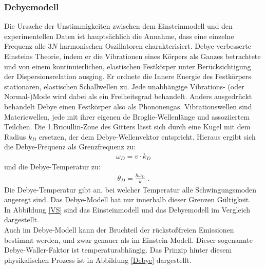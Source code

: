 \subsubsection{Debyemodell}

Die Ursache der Unstimmigkeiten zwischen dem Einsteinmodell und den experimentellen Daten ist hauptsächlich die Annahme, dass eine einzelne Frequenz alle $3N$ harmonischen Oszillatoren charakterisiert. Debye verbesserte Einsteins Theorie, indem er die Vibrationen eines Körpers als Ganzes betrachtete und von einem kontinuierlichen, elastischen Festkörper unter Berücksichtigung der Dispersionsrelation ausging. Er ordnete die Innere Energie des Festkörpers stationären, elastischen Schallwellen zu. Jede unabhängige Vibrations- (oder Normal-)Mode wird dabei als ein Freiheitsgrad behandelt.
Anders ausgedrückt behandelt Debye einen Festkörper also als Phononengas. Vibrationswellen sind Materiewellen, jede mit ihrer eigenen de Broglie-Wellenlänge und assoziiertem Teilchen. 
Die 1.Brioullin-Zone des Gitters lässt sich durch eine Kugel mit dem  Radius $k_D$ ersetzen, der dem Debye-Wellenvektor entspricht. Hieraus ergibt sich die Debye-Frequenz als Grenzfrequenz zu:
\begin{align}
\omega_D = v\cdot k_D
\end{align}
und die Debye-Temperatur zu:
\begin{align}
\theta_D = \frac{\hbar\omega_D}{k}\text{ .}
\end{align}
Die Debye-Temperatur gibt an, bei welcher Temperatur alle Schwingungsmoden angeregt sind. Das Debye-Modell hat nur innerhalb dieser Grenzen Gültigkeit.\\
In Abbildung \ref{VS} sind das Einsteinmodell und das Debyemodell im Vergleich dargestellt.\\

Auch im Debye-Modell kann der Bruchteil der rückstoßfreien Emissionen bestimmt werden, und zwar genauer als im Einstein-Modell. Dieser sogenannte Debye-Waller-Faktor ist temperaturabhängig. Das Prinzip hinter diesem physikalischen Prozess ist in Abbildung \ref{Debye} dargestellt.



